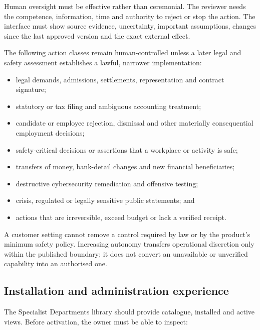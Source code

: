 Human oversight must be effective rather than ceremonial.  The reviewer needs
the competence, information, time and authority to reject or stop the action.
The interface must show source evidence, uncertainty, important assumptions,
changes since the last approved version and the exact external effect.

The following action classes remain human-controlled unless a later legal and
safety assessment establishes a lawful, narrower implementation:

\begin{itemize}[leftmargin=*]
  \item legal demands, admissions, settlements, representation and contract
        signature;
  \item statutory or tax filing and ambiguous accounting treatment;
  \item candidate or employee rejection, dismissal and other materially
        consequential employment decisions;
  \item safety-critical decisions or assertions that a workplace or activity is
        safe;
  \item transfers of money, bank-detail changes and new financial beneficiaries;
  \item destructive cybersecurity remediation and offensive testing;
  \item crisis, regulated or legally sensitive public statements; and
  \item actions that are irreversible, exceed budget or lack a verified receipt.
\end{itemize}

A customer setting cannot remove a control required by law or by the product's
minimum safety policy.  Increasing autonomy transfers operational discretion
only within the published boundary; it does not convert an unavailable or
unverified capability into an authorised one.

\subsection{Installation and administration experience}

The Specialist Departments library should provide catalogue, installed and
active views.  Before activation, the owner must be able to inspect:

